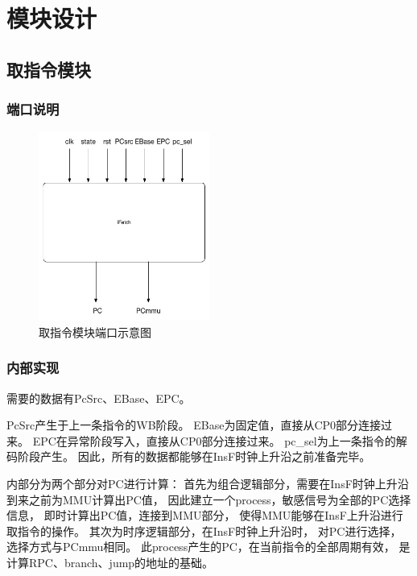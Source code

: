 \section{模块设计}
    \subsection{取指令模块}
        \subsubsection{端口说明}
             

            \begin{figure}[!hbp]
                \centering
                \caption{取指令模块端口示意图}
                \includegraphics[width=0.5\textwidth]{chart/ifetch.jpg}
            \end{figure}
        \subsubsection{内部实现}
            需要的数据有PcSrc、EBase、EPC。

            PcSrc产生于上一条指令的WB阶段。%
            EBase为固定值，直接从CP0部分连接过来。%
            EPC在异常阶段写入，直接从CP0部分连接过来。%
            pc\_sel为上一条指令的解码阶段产生。%
            因此，所有的数据都能够在InsF时钟上升沿之前准备完毕。

            内部分为两个部分对PC进行计算：%
            首先为组合逻辑部分，需要在InsF时钟上升沿到来之前为MMU计算出PC值，%
            因此建立一个process，敏感信号为全部的PC选择信息，%
            即时计算出PC值，连接到MMU部分，%
            使得MMU能够在InsF上升沿进行取指令的操作。%
            其次为时序逻辑部分，在InsF时钟上升沿时，%
            对PC进行选择，选择方式与PCmmu相同。%
            此process产生的PC，在当前指令的全部周期有效，%
            是计算RPC、branch、jump的地址的基础。%
